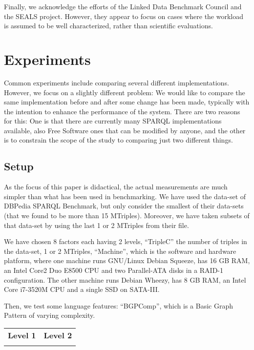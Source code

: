 \documentclass{llncs}
\begin{document}
Finally, we acknowledge the efforts of the Linked Data Benchmark
Council and the SEALS project. However, they appear to focus on cases
where the workload is assumed to be well characterized, rather than
scientific evaluations.


\section{Experiments}

Common experiments include comparing several different
implementations. However, we focus on a slightly different problem: We
would like to compare the same implementation before and after some
change has been made, typically with the intention to enhance the
performance of the system. There are two reasons for this: One is that
there are currently many SPARQL implementations available, also Free
Software ones that can be modified by anyone, and the other is to
constrain the scope of the study to comparing just two different
things.

\subsection{Setup}

As the focus of this paper is didactical, the actual measurements are
much simpler than what has been used in benchmarking. We have used the
data-set of DBPedia SPARQL Benchmark\cite{mxro:Morsey2011DBpedia}, but
only consider the smallest of their data-sets (that we found to be
more than 15 MTriples). Moreover, we have taken subsets of that
data-set by using the last 1 or 2 MTriples from their file.


We have chosen 8 factors each having 2 levels, ``TripleC'' the number
of triples in the data-set, 1 or 2 MTriples, ``Machine'', which is the
software and hardware platform, where one machine runs GNU/Linux
Debian Squeeze, has 16 GB RAM, an Intel Core2 Duo E8500 CPU and two
Parallel-ATA disks in a RAID-1 configuration. The other machine runs
Debian Wheezy, has 8 GB RAM, an Intel Core i7-3520M CPU and a single
SSD on SATA-III.

Then, we test some language features: ``BGPComp'', which is a Basic
Graph Pattern of varying complexity. 

  \begin{center}\small
    \begin{tabular}{|@{~~}p{}|@{~~}p{}|}
      \hline
      \textbf{Level 1} & \textbf{Level 2} \\[-2ex] 
      
      & \\
      \hline
    \end{tabular}
  \end{center}
\end{document}
